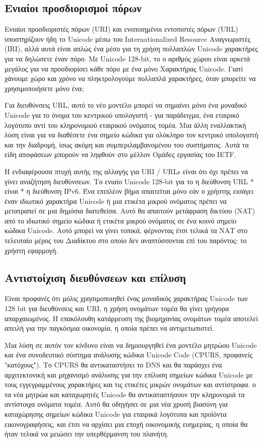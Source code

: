 \documentclass[11pt,a4paper,notitlepage,fleqn]{article}
\begin{document}
\subsection{Ενιαίοι προσδιορισμοί πόρων}

Ενιαίοι προσδιοριστές πόρων (URI) και ενοποιημένοι εντοπιστές πόρων
(URL) υποστηρίζουν ήδη το Unicode μέσω του Internationalized Resource
Αναγνωριστές (IRI), αλλά αυτά είναι απλώς ένα μέσο για τη χρήση πολλαπλών
Unicode χαρακτήρες για να δηλώσετε έναν πόρο. Με Unicode 128-bit, το
ο αριθμός χώρου είναι αρκετά μεγάλος για να προσδιορίσει κάθε πόρο με ένα μόνο
Χαρακτήρας Unicode. Γιατί χάνουμε χώρο και χρόνο να πληκτρολογούμε πολλαπλά
χαρακτήρες, όταν μπορείτε να χρησιμοποιήσετε μόνο ένα;

Για διευθύνσεις URL, αυτό το νέο μοντέλο μπορεί να σημαίνει μόνο ένα μοναδικό Unicode
για το όνομα του κεντρικού υπολογιστή - για παράδειγμα, ένα εταιρικό λογότυπο
αντί του κληρονομιού εταιρικού ονόματος τομέα. Μια άλλη εναλλακτική λύση είναι
για να διαθέσετε ένα σημείο κώδικα για ολόκληρο τον κεντρικό υπολογιστή και την διαδρομή, ίσως ακόμη και
συμπεριλαμβανομένου του συστήματος. Αυτά τα είδη αποφάσεων μπορούν να ληφθούν στο μέλλον
Ομάδες εργασίας του IETF.

Η ενδιαφέρουσα πτυχή αυτής της αλλαγής για URI / URLs είναι ότι όχι
πρέπει να γίνει αναζήτηση διευθύνσεων. Το ενιαίο Unicode 128-bit για το
η διεύθυνση URL * είναι * η διεύθυνση IPv6. Ένα επιπλέον βήμα απαιτείται μόνο εάν
ο χρήστης εισάγει έναν ιδιωτικό χαρακτήρα Unicode ή μια ετικέτα μικρού ονόματος
πρέπει να μετατραπεί σε μια δημόσια διατεθείσα. Αυτό θα
απαιτούν μετάφραση δικτύου (NAT) από το ιδιωτικό σημείο κώδικα
ή ετικέτα μικρού ονόματος σε ένα κοινό σημείο κώδικα Unicode. Αυτό μπορεί να γίνει
τοπικά, φέρνοντας έτσι τελικά τα ΝΑΤ στο τελευταίο μέρος του
Διαδίκτυο στο οποίο δεν αναπτύσσονται επί του παρόντος: το χρήστη
εφαρμογή.

\subsection{Αντιστοίχιση διευθύνσεων και επίλυση}

Είναι προφανές ότι μόλις χρησιμοποιηθεί ένας μοναδικός χαρακτήρας Unicode των 128 bit
για διευθύνσεις και URI, η χρήση ονομάτων τομέα θα γίνει γρήγορα
απαρχαιωμένος. Η επακόλουθη κατάρρευση της βιομηχανίας ονομάτων τομέα
αποτελεί απειλή για την παγκόσμια οικονομία, η οποία πρέπει να αντιμετωπιστεί.

Μια λύση σε αυτόν τον κίνδυνο είναι να δημιουργηθεί ένα μοντέλο μητρώου Unicode
και ένα συνοδευτικό σύστημα ανάλυσης κώδικα Unicode Code (CPURS,
προφανείς "κατόχους"). Το CPURS θα αντικαταστήσει το DNS και θα παράσχει ένα
αρχιτεκτονική και μηχανισμό ανάλυσης για την επίλυση σημείων κώδικα Unicode
με τους εγγεγραμμένους χαρακτήρες και τις ετικέτες μικρών ονομάτων και αντίστροφα. ο
τα νέα μητρώα και καταχωρητές Unicode θα αντικαταστήσουν την κληρονομιά
τα αντίστοιχα ονόματα τομέα. Αυτό θα οδηγήσει σε μια νέα χρυσή βιασύνη για
καταχώρησης σημείων κώδικα Unicode για εταιρικά λογότυπα και προϊόντα
εικονογραφήσεις, και έτσι να αρχίσει μια εποχή οικονομικής ευημερίας, η οποία θα ήταν
τελικά να μειώσει την υπερθέρμανση του πλανήτη.
\end{document}
